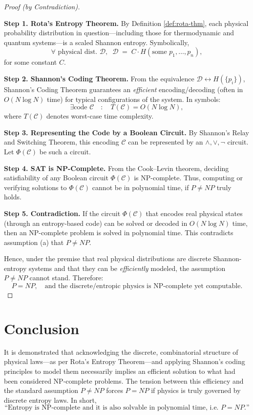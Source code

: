 \documentclass{report}
\begin{document}
\begin{proof}[Proof (by Contradiction)]
\ 

\noindent\textbf{Step 1. Rota's Entropy Theorem.}  
By Definition \ref{def:rota-thm}, each physical probability distribution in question---including those for thermodynamic and quantum systems---is a scaled Shannon entropy. Symbolically,
\[
\forall \text{ physical dist. } \mathcal{D},\;\; \mathcal{D} \;=\; C \cdot H(\text{some } p_1,\ldots,p_n),
\]
for some constant \(C\).

\noindent\textbf{Step 2. Shannon’s Coding Theorem.}  
From the equivalence \(\mathcal{D} \leftrightarrow H(\{p_i\})\), Shannon's Coding Theorem guarantees an \textit{efficient} encoding/decoding (often in \(O(N \log N)\) time) for typical configurations of the system. In symbols:
\[
\exists \text{code } \mathcal{C} \quad : \quad T(\mathcal{C}) = O(N \log N),
\]
where \(T(\mathcal{C})\) denotes worst-case time complexity.

\noindent\textbf{Step 3. Representing the Code by a Boolean Circuit.}  
By Shannon's Relay and Switching Theorem, this encoding \(\mathcal{C}\) can be represented by an \(\wedge, \vee, \neg\) circuit. Let \(\Phi(\mathcal{C})\) be such a circuit.

\noindent\textbf{Step 4. SAT is NP-Complete.}  
From the Cook–Levin theorem, deciding satisfiability of any Boolean circuit \(\Phi(\mathcal{C})\) is NP-complete. Thus, computing or verifying solutions to \(\Phi(\mathcal{C})\) cannot be in polynomial time, if \(P \neq NP\) truly holds.

\noindent\textbf{Step 5. Contradiction.}  
If the circuit \(\Phi(\mathcal{C})\) that encodes real physical states (through an entropy-based code) can be solved or decoded in \(O(N \log N)\) time, then an NP-complete problem is solved in polynomial time. This contradicts assumption (a) that \(P \neq NP\).

\noindent Hence, under the premise that real physical distributions are discrete Shannon-entropy systems and that they can be \textit{efficiently} modeled, the assumption \(P \neq NP\) cannot stand. Therefore:
\[
\boxed{ P = NP, \quad \text{and the discrete/entropic physics is NP-complete yet computable.} }
\]
\end{proof}

\section*{Conclusion}
It is demonstrated that acknowledging the discrete, combinatorial structure of physical laws---as per Rota's Entropy Theorem---and applying Shannon's coding principles to model them necessarily implies an efficient solution to what had been considered NP-complete problems. The tension between this efficiency and the standard assumption \(P \neq NP\) forces \(P = NP\) if physics is truly governed by discrete entropy laws. In short,
\[
\text{“Entropy is NP-complete and it is also solvable in polynomial time, i.e.\ } P = NP\text{.”}
\]
\end{document}
